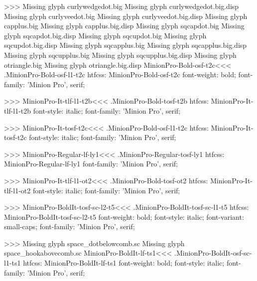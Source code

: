 {>>>
Missing glyph	curlywedgedot.big
Missing glyph	curlywedgedot.big.disp
Missing glyph	curlyveedot.big
Missing glyph	curlyveedot.big.disp
Missing glyph	capplus.big
Missing glyph	capplus.big.disp
Missing glyph	sqcapdot.big
Missing glyph	sqcapdot.big.disp
Missing glyph	sqcupdot.big
Missing glyph	sqcupdot.big.disp
Missing glyph	sqcapplus.big
Missing glyph	sqcapplus.big.disp
Missing glyph	sqcupplus.big
Missing glyph	sqcupplus.big.disp
Missing glyph	otriangle.big
Missing glyph	otriangle.big.disp
\<MinionPro-Bold-osf-t2c\><<<
.MinionPro-Bold-osf-l1-t2c
htfcss:  MinionPro-Bold-osf-t2c  font-weight: bold; font-family: 'Minion Pro', serif;

>>>
\<MinionPro-It-tlf-l1-t2b\><<<
.MinionPro-Bold-tosf-t2b
htfcss:  MinionPro-It-tlf-l1-t2b  font-style: italic; font-family: 'Minion Pro', serif;

>>>
\<MinionPro-It-tosf-t2c\><<<
.MinionPro-Bold-osf-l1-t2c
htfcss:  MinionPro-It-tosf-t2c  font-style: italic; font-family: 'Minion Pro', serif;

>>>
\<MinionPro-Regular-lf-ly1\><<<
.MinionPro-Regular-tosf-ly1
htfcss:  MinionPro-Regular-lf-ly1  font-family: 'Minion Pro', serif;

>>>
\<MinionPro-It-tlf-l1-ot2\><<<
.MinionPro-Bold-tosf-ot2
htfcss:  MinionPro-It-tlf-l1-ot2  font-style: italic; font-family: 'Minion Pro', serif;

>>>
\<MinionPro-BoldIt-tosf-sc-l2-t5\><<<
.MinionPro-BoldIt-tosf-sc-l1-t5
htfcss:  MinionPro-BoldIt-tosf-sc-l2-t5  font-weight: bold; font-style: italic; font-variant: small-caps; font-family: 'Minion Pro', serif;

>>>
Missing glyph	space_dotbelowcomb.sc
Missing glyph	space_hookabovecomb.sc
\<MinionPro-BoldIt-lf-ts1\><<<
.MinionPro-BoldIt-osf-sc-l1-ts1
htfcss:  MinionPro-BoldIt-lf-ts1  font-weight: bold; font-style: italic; font-family: 'Minion Pro', serif;

}
